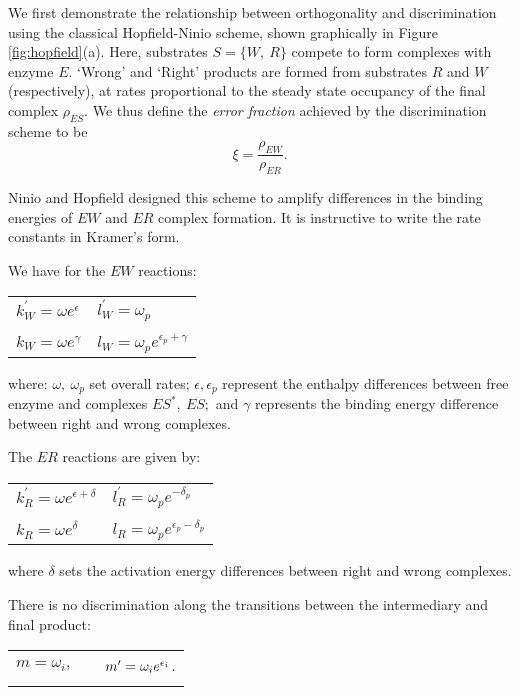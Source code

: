We first demonstrate the relationship between orthogonality and discrimination using the classical Hopfield-Ninio scheme, shown graphically in Figure \ref{fig:hopfield}(a).  Here, substrates $S= \{W, \ R\}$ compete to form complexes with enzyme $E$.  `Wrong' and `Right' products are formed from substrates $R$ and $W$ (respectively), at rates proportional to the steady state occupancy of the final complex $\rho_{ES}.$  We thus define the {\it error fraction} achieved by the discrimination scheme to be
\[
\xi = \frac{\rho_{EW}}{\rho_{ER}}.
\]

Ninio and Hopfield designed this scheme to amplify differences in the binding energies of $EW$ and $ER$ complex formation.  It is instructive to write the rate constants in Kramer's form.

We have for the $EW$ reactions:
\begin{center}
\begin{tabular}{ll}
$k^{\prime}_W = \omega e^\epsilon$ & $l^{\prime}_W = \omega_p$\\
\\
$k_W =  \omega e^\gamma $&$ l_W = \omega_p e^{\epsilon_p+\gamma}$\\
\end{tabular}
\end{center}
where: $\omega, \ \omega_p$ set overall rates; $\epsilon, \epsilon_p$ represent the enthalpy differences between free enzyme and complexes $ES^*, \ ES;$ and $\gamma$ represents the binding energy difference between right and wrong complexes.

The $ER$ reactions are given by:
\begin{center}
\begin{tabular}{ll}
$k^{\prime}_R = \omega e^{\epsilon+\delta}$ & $l^{\prime}_R = \omega_pe^{-\delta_p}$\\
\\
$k_R =  \omega e^\delta $&$ l_R = \omega_p e^{\epsilon_p-\delta_p}$\\
\end{tabular}
\end{center}
where $\delta$ sets the activation energy differences between right and wrong complexes.

There is no discrimination along the transitions between the intermediary and final product:
\begin{center}
\begin{tabular}{ccc}
$m = \omega_i,$  & & $m' = \omega_i e^{\epsilon_i}$.\\
\\
\end{tabular}
\end{center}

